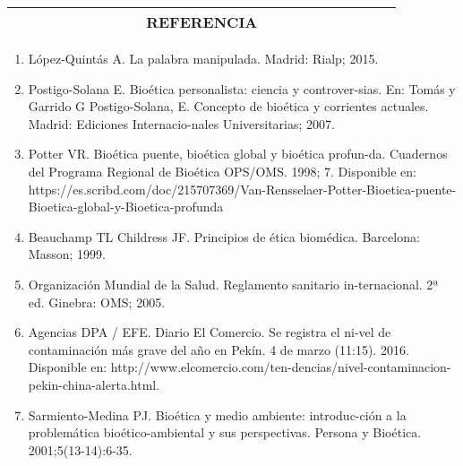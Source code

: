 \documentclass[12pt,letterpaper]{article}
\begin{document}
\pagestyle{fancy}
        \fancyhf{}
        \rhead{}
\begin{multicols}{2}

\begin{center}
\begin{tabular}{c}\hline
    \noindent \small {\textcolor{white}{------------------------}REFERENCIA\textcolor{white}{------------------------}} \\\hline
\end{tabular}

\end{center}
\begin{enumerate}
    \item {\scriptsize López-Quintás A. La palabra manipulada. Madrid: Rialp; 2015.}
    
    \item {\scriptsize Postigo-Solana E.  Bioética  personalista:  ciencia  y  controver-sias. En: Tomás y Garrido G Postigo-Solana, E. Concepto de bioética  y  corrientes  actuales.  Madrid:  Ediciones  Internacio-nales Universitarias; 2007.}
    
    \item {\scriptsize Potter VR. Bioética puente, bioética global y bioética profun-da. Cuadernos del Programa Regional de Bioética OPS/OMS. 1998; 7. Disponible en: https://es.scribd.com/doc/215707369/Van-Rensselaer-Potter-Bioetica-puente-Bioetica-global-y-Bioetica-profunda}
    
    \item {\scriptsize Beauchamp  TL  Childress  JF.  Principios  de  ética  biomédica.  Barcelona: Masson; 1999.}
    
    \item {\scriptsize Organización  Mundial  de  la  Salud.  Reglamento  sanitario  in-ternacional. 2ª ed. Ginebra: OMS; 2005.}
    
    \item {\scriptsize Agencias DPA / EFE. Diario El Comercio. Se registra el ni-vel de contaminación más grave del año en Pekín. 4 de marzo (11:15). 2016. Disponible en: http://www.elcomercio.com/ten-dencias/nivel-contaminacion-pekin-china-alerta.html.}
    
    \item {\scriptsize Sarmiento-Medina  PJ.  Bioética  y  medio  ambiente:  introduc-ción  a  la  problemática  bioético-ambiental  y  sus  perspectivas.  Persona y Bioética. 2001;5(13-14):6-35.}
    

\end{enumerate}
\end{multicols}
\end{document}
